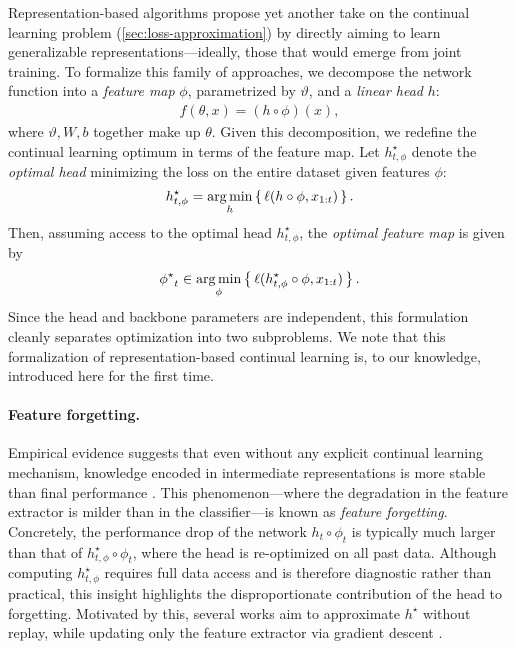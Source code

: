 \documentclass[10pt]{article} %
\DeclareMathOperator*{\argmin}{arg\,min}
\begin{document}
Representation-based algorithms propose yet another take on the continual learning problem (\cref{sec:loss-approximation}) by directly aiming to learn generalizable representations—ideally, those that would emerge from joint training.  
To formalize this family of approaches, we decompose the network function into a \emph{feature map} $\phi$, parametrized by $\vartheta$, and a \emph{linear head} $h$:
\begin{align*}
    f(\theta, x) = (h \circ \phi)(x),
\end{align*}
where $\vartheta, W, b$ together make up $\theta$.  
Given this decomposition, we redefine the continual learning optimum in terms of the feature map.  
Let $h_{t,\phi}^\star$ denote the \emph{optimal head} minimizing the loss on the entire dataset given features $\phi$:
\[
h_{t,\phi}^\star = \argmin_{h}\left\{\, \loss(h \circ \phi, x_{1:t}) \,\right\}.
\]
Then, assuming access to the optimal head $h_{t,\phi}^\star$, the \emph{optimal feature map} is given by
\begin{align}
    \label{eq:optimal-feature-map}
    {\phi^\star}_t \in \argmin_{\phi} \left\{\, \loss(h_{t,\phi}^\star \circ \phi, x_{1:t}) \,\right\}.
\end{align}
Since the head and backbone parameters are independent, this formulation cleanly separates optimization into two subproblems.  
We note that this formalization of representation-based continual learning is, to our knowledge, introduced here for the first time.

\paragraph{Feature forgetting.}
Empirical evidence suggests that even without any explicit continual learning mechanism, knowledge encoded in intermediate representations is more stable than final performance \citep{hessKnowledgeAccumulationContinually2023,ramaseshAnatomyCatastrophicForgetting2020}.  
This phenomenon—where the degradation in the feature extractor is milder than in the classifier—is known as \emph{feature forgetting}.  
Concretely, the performance drop of the network $h_t \circ \phi_t$ is typically much larger than that of $h_{t,\phi}^\star \circ \phi_t$, where the head is re-optimized on all past data.  
Although computing $h_{t,\phi}^\star$ requires full data access and is therefore diagnostic rather than practical, this insight highlights the disproportionate contribution of the head to forgetting.  
Motivated by this, several works aim to approximate $h^\star$ without replay, while updating only the feature extractor via gradient descent \citep{houLearningUnifiedClassifier2019,wuLargeScaleIncremental2019a,zhaoMaintainingDiscriminationFairness2019}.
\end{document}
